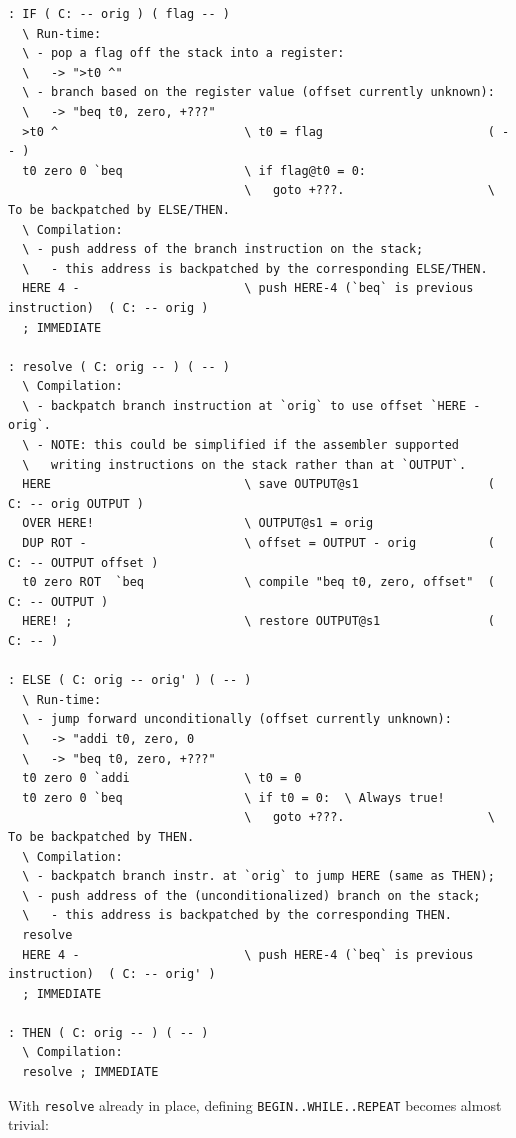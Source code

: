 \documentclass[a4paper,12pt,final]{article}
\begin{document}
\fontsize{9pt}{9.000000pt}\selectfont
\begin{verbatim}
: IF ( C: -- orig ) ( flag -- )
  \ Run-time:
  \ - pop a flag off the stack into a register:
  \   -> ">t0 ^"
  \ - branch based on the register value (offset currently unknown):
  \   -> "beq t0, zero, +???"
  >t0 ^                          \ t0 = flag                       ( -- )
  t0 zero 0 `beq                 \ if flag@t0 = 0:
                                 \   goto +???.                    \ To be backpatched by ELSE/THEN.
  \ Compilation:
  \ - push address of the branch instruction on the stack;
  \   - this address is backpatched by the corresponding ELSE/THEN.
  HERE 4 -                       \ push HERE-4 (`beq` is previous instruction)  ( C: -- orig )
  ; IMMEDIATE

: resolve ( C: orig -- ) ( -- )
  \ Compilation:
  \ - backpatch branch instruction at `orig` to use offset `HERE - orig`.
  \ - NOTE: this could be simplified if the assembler supported
  \   writing instructions on the stack rather than at `OUTPUT`.
  HERE                           \ save OUTPUT@s1                  ( C: -- orig OUTPUT )
  OVER HERE!                     \ OUTPUT@s1 = orig
  DUP ROT -                      \ offset = OUTPUT - orig          ( C: -- OUTPUT offset )
  t0 zero ROT  `beq              \ compile "beq t0, zero, offset"  ( C: -- OUTPUT )
  HERE! ;                        \ restore OUTPUT@s1               ( C: -- )

: ELSE ( C: orig -- orig' ) ( -- )
  \ Run-time:
  \ - jump forward unconditionally (offset currently unknown):
  \   -> "addi t0, zero, 0
  \   -> "beq t0, zero, +???"
  t0 zero 0 `addi                \ t0 = 0
  t0 zero 0 `beq                 \ if t0 = 0:  \ Always true!
                                 \   goto +???.                    \ To be backpatched by THEN.
  \ Compilation:
  \ - backpatch branch instr. at `orig` to jump HERE (same as THEN);
  \ - push address of the (unconditionalized) branch on the stack;
  \   - this address is backpatched by the corresponding THEN.
  resolve
  HERE 4 -                       \ push HERE-4 (`beq` is previous instruction)  ( C: -- orig' )
  ; IMMEDIATE

: THEN ( C: orig -- ) ( -- )
  \ Compilation:
  resolve ; IMMEDIATE
\end{verbatim}
\normalsize

With \texttt{resolve} already in place, defining \texttt{BEGIN..WHILE..REPEAT}
becomes almost trivial:
\end{document}
